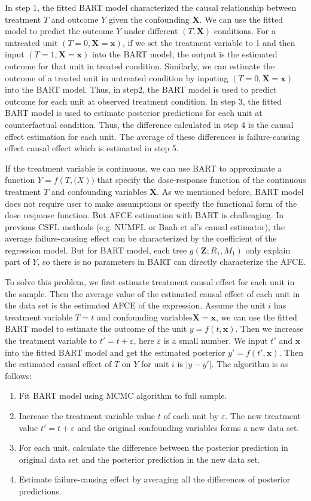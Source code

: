 In step 1, the fitted BART model characterized the causal relationship between treatment $T$ and outcome $Y$ given the confounding $\pmb{X}$. We can use the fitted model to predict the outcome $Y$ under different $(T, \pmb{X})$ conditions. For a untreated unit $(T=0, \pmb{X}=\pmb{x})$,  if we set the treatment variable to 1 and then input $(T=1, \pmb{X}=\pmb{x})$ into the BART model, the output is the estimated outcome for that unit in treated condition. Similarly, we can estimate the outcome of a treated unit in untreated condition by inputing $(T=0, \pmb{X}=\pmb{x})$ into the BART model. Thus, in step2, the BART model is used to predict outcome for each unit at observed treatment condition. In step 3, the fitted BART model is used to estimate posterior predictions for each unit at counterfactual condition. Thus, the difference calculated in step 4 is the causal effect estimation for each unit. The average of these differences is failure-causing effect causal effect which is estimated in step 5.

If the treatment variable is continuous,  we can use BART to approximate a function $Y=f(T,\pmb(X))$ that specify the dose-response function of the continuous treatment $T$ and confounding variables $\pmb{X}$.  As we mentioned before, BART model does not require user to make assumptions or specify the functional form of the dose response function.  But AFCE estimation with BART is challenging. In previous CSFL methods (e.g. NUMFL or Baah et al’s causal estimator), the average failure-causing effect can be characterized by the coefficient of the regression model.  But for BART model, each tree $g(\pmb{Z};{R_1},{M_1})$ only explain part of $Y$, so there is no parameters in BART can directly characterize the AFCE. 

To solve this problem, we first estimate treatment causal effect for  each unit in the sample. Then the average value of the estimated causal effect of each unit in the data set is the estimated AFCE of the expression.  Assume the unit $i$ has treatment variable $T=t$ and confounding variables$\pmb {X}=\pmb {x}$, we can use the fitted BART model to estimate the outcome of the unit $y=f(t,\pmb{x})$. Then we increase the treatment variable to $t'=t+\varepsilon$, here $\varepsilon $ is a small number. We input $t'$ and $\pmb{x}$ into the fitted BART model and get the estimated posterior $y'=f(t',\pmb{x})$. Then the estimated causal effect of $T$ on $Y$ for unit $i$ is $\left| {y - y'} \right|$. The algorithm is as follows:
\begin{enumerate}
\item Fit BART model using MCMC algorithm to full sample.
\item Increase the treatment variable value $t$ of each unit by $\varepsilon $. The new treatment value $t'=t+\varepsilon$ and the original confounding variables forms a new data set.
\item For each unit, calculate the difference between the posterior prediction in original data set and the posterior prediction in the new data set.
\item Estimate failure-causing effect by averaging all the differences of posterior predictions.
\end{enumerate}

